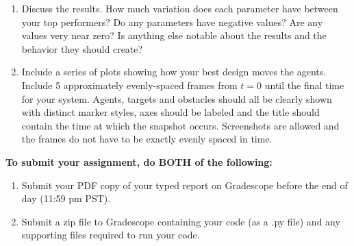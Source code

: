\documentclass{article}
\begin{document}
\begin{enumerate}


\item Discuss the results. How much variation does each parameter have between your top performers? Do any parameters have negative values? Are any values very near zero? Is anything else notable about the results and the behavior they should create? 


\item{ Include a series of plots showing how your best design moves the agents. Include 5 approximately evenly-spaced frames from $t = 0$ until the final time for your system. Agents, targets and obstacles should all be clearly shown with distinct marker styles, axes should be labeled and the title should contain the time at which the snapshot occurs. Screenshots are allowed and the frames do not have to be exactly evenly spaced in time.}



\end{enumerate}





\textbf{To submit your assignment, do BOTH of the following:}
\begin{enumerate}
    \item Submit your PDF copy of your typed report on Gradescope before the end of day (11:59 pm PST). 
    \item Submit a zip file to Gradescope containing your code (as a .py file) and any supporting files required to run your code. 
\end{enumerate}



\end{document}
